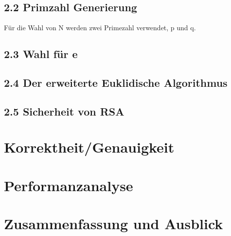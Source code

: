 \documentclass[course=asp]{aspdoc}
\begin{document}
\subsection*{2.2 Primzahl Generierung }
Für die Wahl von N werden zwei Primezahl verwendet, p und q.

\subsection*{2.3 Wahl für e }
\subsection*{2.4 Der erweiterte Euklidische Algorithmus}
\subsection*{2.5 Sicherheit von RSA}



\section{Korrektheit/Genauigkeit}


\section{Performanzanalyse}


\section{Zusammenfassung und Ausblick}


{}
\end{document}

